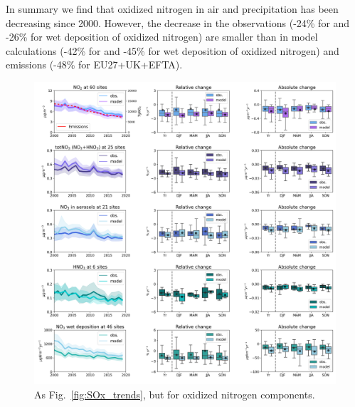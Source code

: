 In summary we find that oxidized nitrogen in air and precipitation has been decreasing since 2000. However, the decrease in the observations (-24\% for \noii and -26\% for wet deposition of oxidized nitrogen) are smaller than in model calculations (-42\% for \noii and -45\% for wet deposition of oxidized nitrogen) and emissions (-48\% for EU27+UK+EFTA). 


\begin{figure}[h]
	\centering
	\includegraphics[width=0.74\paperwidth]{FIGS_TRENDS/Nox_trends.png}
	\caption{\label{fig:NOx_trends} As Fig.~\ref{fig:SOx_trends}, but for oxidized nitrogen components.
	}
\end{figure}

